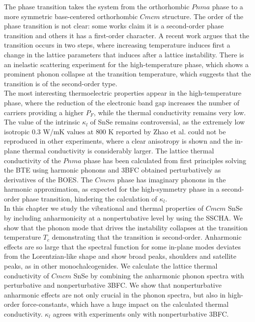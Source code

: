 The phase transition takes the system from the orthorhombic $Pnma$ phase to a more symmetric base-centered orthorhombic $Cmcm$ structure. The order of the phase transition is not clear: some works\cite{zhao2014ultralow,
adouby1998structure,chattopadhyay1986neutron,chatterji2018soft} claim it is a second-order phase transition and others\cite{von1981high} it has a first-order character. A recent work\cite{dewandre2016two} argues that the transition occurs in 
two steps, where increasing temperature induces first a change in the lattice parameters that induces after a lattice instability. There is an inelastic scattering experiment for the high-temperature phase, which shows a prominent phonon collapse at the transition temperature, which suggests that the transition is of the second-order type\cite{chatterji2018soft}. \\

The most interesting thermoelectric properties appear in the high-temperature phase, where the reduction of the electronic band gap increases the number of carriers providing a higher $P_{F}$, while the thermal conductivity 
remains very low. The value of the intrinsic $\kappa_{l}$ of SnSe remains controversial, as the extremely low isotropic $0.3$ W/mK values at $800$ K reported by Zhao et al.\cite{zhao2014ultralow} could not be reproduced in 
other experiments, where a clear anisotropy is shown and the in-plane thermal conductivity is considerably larger\cite{ibrahim2017reinvestigation,sassi2014assessment,chen2014thermoelectric}. The lattice thermal conductivity 
of the $Pnma$ phase has been calculated\cite{carrete2014low,skelton2016anharmonicity} from first principles solving the BTE using harmonic phonons and 3BFC obtained perturbatively as derivatives of the BOES. The $Cmcm$ phase 
has imaginary phonons in the harmonic approximation\cite{dewandre2016two,skelton2016anharmonicity,yu2016enhanced}, as expected for the high-symmetry phase in a second-order phase transition, hindering the 
calculation of $\kappa_{l}$. \\

In this chapter we study the vibrational and thermal properties of $Cmcm$ SnSe by including anharmonicity at a nonpertubative level by using the SSCHA. We show that the phonon mode that drives the instability collapses at the 
transition temperature $T_{c}$ demonstrating that the transition is second-order. Anharmonic effects are so large that the spectral function for some in-plane modes deviates from the Lorentzian-like shape and show broad peaks, 
shoulders and satellite peaks, as in other monochalcogenides\cite{ribeiro2018strong,li2014phonon}. We calculate the lattice thermal conductivity of $Cmcm$ SnSe by combining the anharmonic phonon spectra with perturbative and 
nonperturbative 3BFC. We show that nonperturbative anharmonic effects are not only crucial in the phonon spectra, but also in high-order force-constants, which have a huge impact on the calculated thermal conductivity. 
$\kappa_{l}$ agrees with experiments\cite{ibrahim2017reinvestigation} only with nonperturbative 3BFC.

